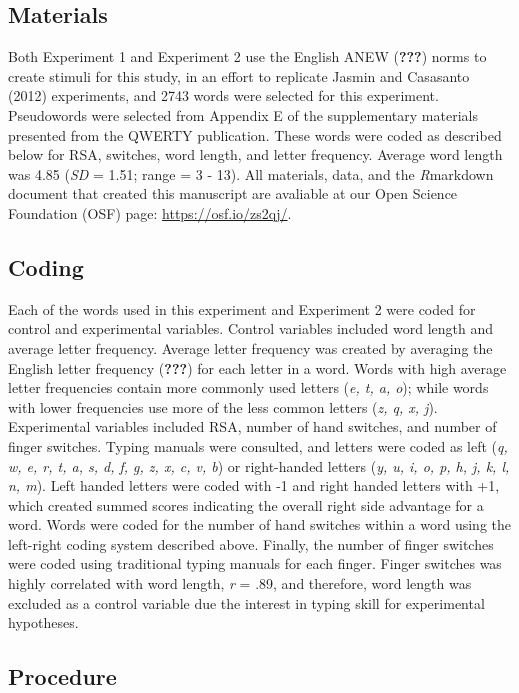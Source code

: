 \documentclass[english,man]{apa6}
\theoremstyle{definition}
\theoremstyle{definition}
\theoremstyle{definition}
\theoremstyle{remark}
\begin{document}
\subsection{Materials}\label{materials}

Both Experiment 1 and Experiment 2 use the English ANEW ({\textbf{???}})
norms to create stimuli for this study, in an effort to replicate Jasmin
and Casasanto (2012) experiments, and 2743 words were selected for this
experiment. Pseudowords were selected from Appendix E of the
supplementary materials presented from the QWERTY publication. These
words were coded as described below for RSA, switches, word length, and
letter frequency. Average word length was 4.85 (\emph{SD} = 1.51; range
= 3 - 13). All materials, data, and the \emph{R}markdown document that
created this manuscript are avaliable at our Open Science Foundation
(OSF) page: \url{https://osf.io/zs2qj/}.

\subsection{Coding}\label{coding}

Each of the words used in this experiment and Experiment 2 were coded
for control and experimental variables. Control variables included word
length and average letter frequency. Average letter frequency was
created by averaging the English letter frequency ({\textbf{???}}) for
each letter in a word. Words with high average letter frequencies
contain more commonly used letters (\emph{e, t, a, o}); while words with
lower frequencies use more of the less common letters (\emph{z, q, x,
j}). Experimental variables included RSA, number of hand switches, and
number of finger switches. Typing manuals were consulted, and letters
were coded as left (\emph{q, w, e, r, t, a, s, d, f, g, z, x, c, v, b})
or right-handed letters (\emph{y, u, i, o, p, h, j, k, l, n, m}). Left
handed letters were coded with -1 and right handed letters with +1,
which created summed scores indicating the overall right side advantage
for a word. Words were coded for the number of hand switches within a
word using the left-right coding system described above. Finally, the
number of finger switches were coded using traditional typing manuals
for each finger. Finger switches was highly correlated with word length,
\emph{r} = .89, and therefore, word length was excluded as a control
variable due the interest in typing skill for experimental hypotheses.

\subsection{Procedure}\label{procedure}
\end{document}
